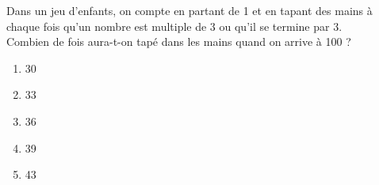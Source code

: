 Dans un jeu d'enfants, on compte en partant de 1 et en tapant des mains à chaque fois qu'un nombre est multiple de 3 ou qu'il se termine par 3.
\\Combien de fois aura-t-on tapé dans les mains quand on arrive à 100 ?
\begin{multicols}{5}
  \begin{enumerate}[A/]
  \item 30
  \item 33
  \item 36
  \item 39
  \item 43
  \end{enumerate}
\end{multicols}